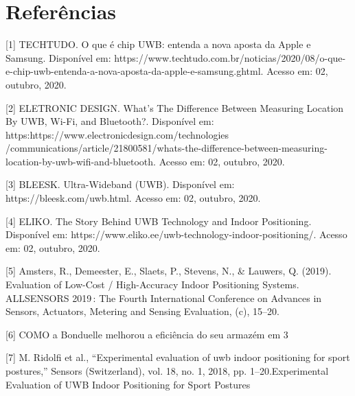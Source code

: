 \chapter{Referências}
[1] TECHTUDO. O que é chip UWB: entenda a nova aposta da Apple e Samsung. Disponível em: https://www.techtudo.com.br/noticias/2020/08/o-que-e-chip-uwb-entenda-a-nova-aposta-da-apple-e-samsung.ghtml. Acesso em: 02, outubro, 2020.

[2] ELETRONIC DESIGN. What’s The Difference Between Measuring Location By UWB, Wi-Fi, and Bluetooth?. Disponível em: https:https://www.electronicdesign.com/technologies
/communications/article/21800581/whats-the-difference-between-measuring-location-by-uwb-wifi-and-bluetooth. Acesso em: 02, outubro, 2020.

[3] BLEESK. Ultra-Wideband (UWB). Disponível em: https://bleesk.com/uwb.html. Acesso em: 02, outubro, 2020.

[4] ELIKO. The Story Behind UWB Technology and Indoor Positioning. Disponível em: https://www.eliko.ee/uwb-technology-indoor-positioning/. Acesso em: 02, outubro, 2020.

[5] Amsters, R., Demeester, E., Slaets, P., Stevens, N., & Lauwers, Q. (2019). Evaluation of Low-Cost / High-Accuracy Indoor Positioning Systems. ALLSENSORS 2019 : The Fourth International Conference on Advances in Sensors, Actuators, Metering and Sensing Evaluation, (c), 15–20.

[6] COMO a Bonduelle melhorou a eficiência do seu armazém em 3%

[7] M. Ridolfi et al., “Experimental evaluation of uwb indoor positioning for sport postures,” Sensors (Switzerland), vol. 18, no. 1, 2018, pp. 1–20.Experimental Evaluation of UWB Indoor Positioning for Sport Postures